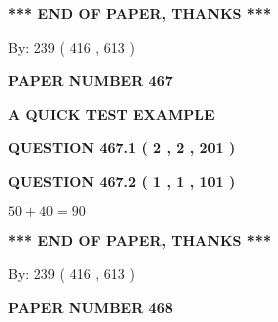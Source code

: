 \documentclass[12pt]{article}
\begin{document}
   
   
   
   
\vspace{1.0in} 
{\textbf{\large{ *** END OF PAPER, THANKS *** }}} 
   
   
\hspace{1.0in} By: 
 239 ( 416 ,  613 )
   
   
   
   
\newpage 
\setcounter{page}{ 
   467001 } 
   
   
   
   
 {\textbf{ \Large{ PAPER NUMBER  467  }}}
   
   
\vspace{0.2in}
   
   
   
   
   
   
 \vspace{0.2in}
{\LARGE {\textbf{ A QUICK TEST EXAMPLE}}}
   
   
  
\vspace{0.2in}
  
{\textbf{\Large{QUESTION
467.1 
 ( 2 , 2 , 201 )
}}}
  
  
  
\vspace{0.2in}
  
{\textbf{\Large{QUESTION
467.2 
 ( 1 , 1 , 101 )
}}}
  
  
 
 

$ %
50 +  %
40=   %
90$
 
 
   
   
 \vspace{0.2in}
 
   
   
   
   
\vspace{1.0in} 
{\textbf{\large{ *** END OF PAPER, THANKS *** }}} 
   
   
\hspace{1.0in} By: 
 239 ( 416 ,  613 )
   
   
   
   
\newpage 
\setcounter{page}{ 
   468001 } 
   
   
   
   
 {\textbf{ \Large{ PAPER NUMBER  468  }}}
   
\end{document}
